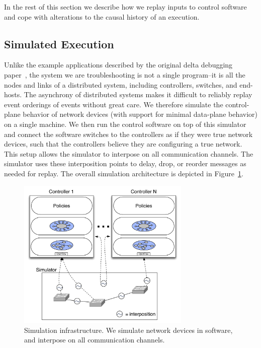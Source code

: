 In the rest of this section we describe how we
replay inputs to control software and
cope with alterations to the causal history of an execution.

\subsection{Simulated Execution}
\label{subsec:simulation}

Unlike the example applications described
by the original delta debugging paper~\cite{Zeller:1999:YMP:318773.318946}, the system we are troubleshooting is not a
single program--it is all the nodes and links of a distributed system,
including controllers, switches, and end-hosts. The asynchrony of distributed
systems makes it difficult to reliably replay event orderings of
events without great care. We therefore simulate the control-plane
behavior of network devices (with support for minimal data-plane behavior) on
a single machine. We then run the control software on
top of this simulator and connect the software switches to the controllers as if they were true
network devices, such that the controllers believe they are configuring a true
network. This setup allows the simulator to interpose on all communication
channels. The simulator uses these interposition points to delay, drop, or reorder
messages as needed for replay. The overall
simulation architecture is depicted in
Figure~\ref{fig:architecture}.

\begin{figure}[t]
    \includegraphics[width=3.25in]{../diagrams/architecture/Debugger_Architecture.pdf}
    \caption[]{\label{fig:architecture} Simulation infrastructure. We simulate
    network devices in software, and interpose on all communication
    channels.}
\end{figure}

